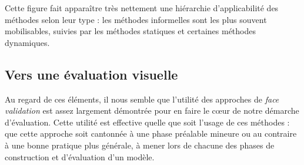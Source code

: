 Cette figure fait apparaître très nettement une \og hiérarchie\fg{} d'applicabilité des méthodes selon leur type : les méthodes informelles sont les plus souvent mobilisables, suivies par les méthodes statiques et certaines méthodes dynamiques.

\subsection{Vers une évaluation visuelle \label{subsec:eval-visuelle}}

Au regard de ces éléments, il nous semble que l'utilité des approches de \textit{face validation} est assez largement démontrée pour en faire le cœur de notre démarche d'évaluation.
Cette utilité est effective quelle que soit l'usage de ces méthodes : que cette approche soit cantonnée à une phase préalable mineure ou au contraire à une bonne pratique plus générale, à mener lors de chacune des phases de construction et d'évaluation d'un modèle.

